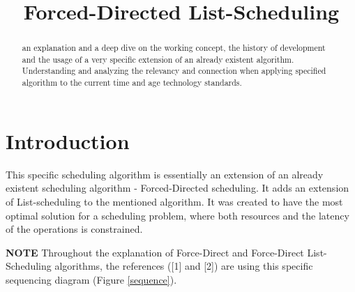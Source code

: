 \documentclass[conference]{IEEEtran}
\begin{document}
\title{Forced-Directed List-Scheduling}

\author{
}

\maketitle

\begin{abstract}
an explanation and a deep dive on the working concept, the history of development and the usage of a very specific extension of an already existent algorithm. Understanding and analyzing the relevancy and connection when applying specified algorithm to the current time and age technology standards.
\end{abstract}



\thispagestyle{firstpagefooter}

\section{Introduction}
This specific scheduling algorithm is essentially an extension of an already existent scheduling algorithm - Forced-Directed scheduling. It adds an extension of List-scheduling to the mentioned algorithm. It was created to have the most optimal solution for a scheduling problem, where both resources and the latency of the operations is constrained.

\textbf{NOTE}
Throughout the explanation of Force-Direct and Force-Direct List-Scheduling algorithms, the references ([1] and [2]) are using this specific sequencing diagram (Figure \ref{sequence}).
\end{document}
